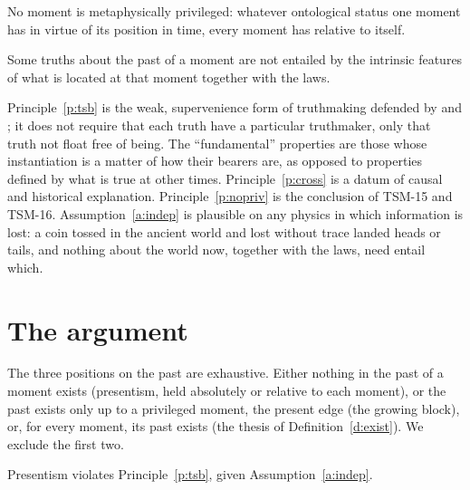 \documentclass{situationist-preprint}
\begin{document}
\begin{principle}\label{p:nopriv}
No moment is metaphysically privileged: whatever ontological status one moment has in virtue of its position in time, every moment has relative to itself.
\end{principle}

\begin{assumption}\label{a:indep}
Some truths about the past of a moment are not entailed by the intrinsic features of what is located at that moment together with the laws.
\end{assumption}

Principle~\ref{p:tsb} is the weak, supervenience form of truthmaking defended by \citet{Bigelow1988} and \citet{Lewis2001}; it does not require that each truth have a particular truthmaker, only that truth not float free of being. The \enquote{fundamental} properties are those whose instantiation is a matter of how their bearers are, as opposed to properties defined by what is true at other times. Principle~\ref{p:cross} is a datum of causal and historical explanation. Principle~\ref{p:nopriv} is the conclusion of TSM-15 and TSM-16. Assumption~\ref{a:indep} is plausible on any physics in which information is lost: a coin tossed in the ancient world and lost without trace landed heads or tails, and nothing about the world now, together with the laws, need entail which.

\section{The argument}

The three positions on the past are exhaustive. Either nothing in the past of a moment exists (presentism, held absolutely or relative to each moment), or the past exists only up to a privileged moment, the present edge (the growing block), or, for every moment, its past exists (the thesis of Definition~\ref{d:exist}). We exclude the first two.

\begin{lemma}\label{l:truth}
Presentism violates Principle~\ref{p:tsb}, given Assumption~\ref{a:indep}.
\end{lemma}
\end{document}
